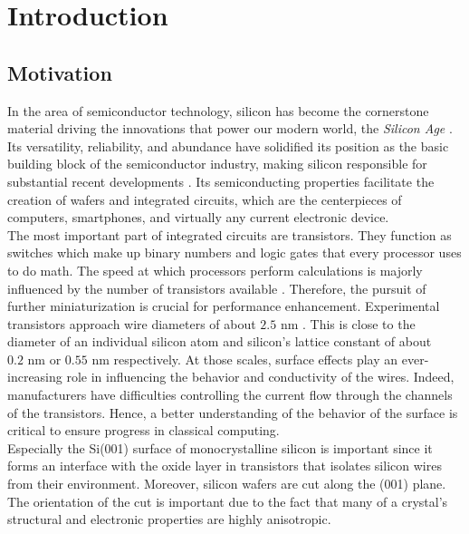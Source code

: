 	
	
	\tableofcontents
	
	
	
	\mainmatter
	\renewcommand{\chapterautorefname}{Chapter}
	\renewcommand{\sectionautorefname}{Section}
	\def\figureautorefname{Fig.}
	\chapter{Introduction}
	\section{Motivation}
	In the area of semiconductor technology, silicon has become the cornerstone material driving the innovations that power our modern world, the \textit{Silicon Age} \cite{dabrowski2000silicon}. Its versatility, reliability, and abundance have solidified its position as the basic building block of the semiconductor industry, making silicon responsible for substantial recent developments \cite{siffert2013silicon}. Its semiconducting properties facilitate the creation of wafers and integrated circuits, which are the centerpieces of computers, smartphones, and virtually any current electronic device. \\
	
	The most important part of integrated circuits are transistors. They function as switches which make up binary numbers and logic gates that every processor uses to do math. The speed at which processors perform calculations is majorly influenced by the number of transistors available \cite{el2015increasing}. Therefore, the pursuit of further miniaturization is crucial for performance enhancement. Experimental transistors approach wire diameters of about $2.5\text{ nm}$ \cite{kim2016valley}. This is close to the diameter of an individual silicon atom and silicon's lattice constant of about $0.2\text{ nm}$ \cite{barsanov1962systematic} or $0.55 \text{ nm}$ \cite{tiesinga2021codata} respectively. At those scales, surface effects play an ever-increasing role in influencing the behavior and conductivity of the wires. Indeed, manufacturers have difficulties controlling the current flow through the channels of the transistors. Hence, a better understanding of the behavior of the surface is critical to ensure progress in classical computing. \\
	
	Especially the Si(001) surface of monocrystalline silicon is important since it forms an interface with the oxide layer in transistors that isolates silicon wires from their environment. Moreover, silicon wafers are cut along the (001) plane. The orientation of the cut is important due to the fact that many of a crystal's structural and electronic properties are highly anisotropic. \\
	
